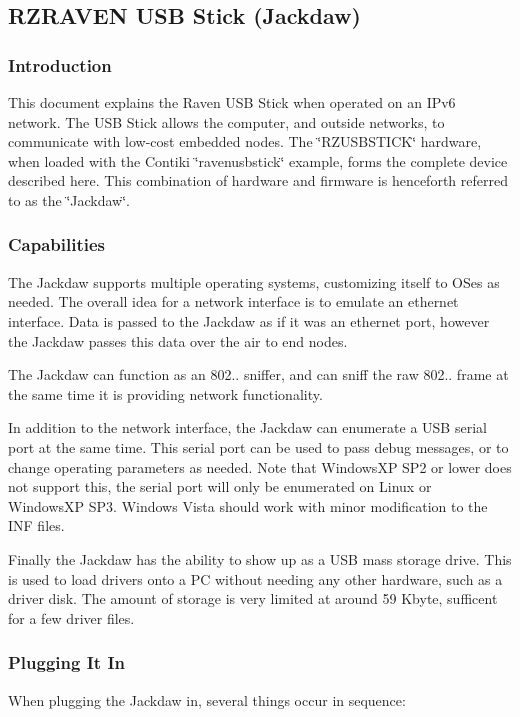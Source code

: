 \hypertarget{a00067}{}\subsection{R\+Z\+R\+A\+V\+EN U\+SB Stick (Jackdaw)}
\label{a00067}
\hypertarget{a00072_introduction}{}\subsubsection{Introduction}\label{a00072_introduction}
This document explains the Raven U\+SB Stick when operated on an I\+Pv6 network. The U\+SB Stick allows the computer, and outside networks, to communicate with low-\/cost embedded nodes. The \char`\"{}\+R\+Z\+U\+S\+B\+S\+T\+I\+C\+K\char`\"{} hardware, when loaded with the Contiki \char`\"{}ravenusbstick\char`\"{} example, forms the complete device described here. This combination of hardware and firmware is henceforth referred to as the \char`\"{}\+Jackdaw\char`\"{}.\hypertarget{a00067_capabilities}{}\subsubsection{Capabilities}\label{a00067_capabilities}
The Jackdaw supports multiple operating systems, customizing itself to O\+Ses as needed. The overall idea for a network interface is to emulate an ethernet interface. Data is passed to the Jackdaw as if it was an ethernet port, however the Jackdaw passes this data over the air to end nodes.

The Jackdaw can function as an 802.. sniffer, and can sniff the raw 802.. frame at the same time it is providing network functionality.

In addition to the network interface, the Jackdaw can enumerate a U\+SB serial port at the same time. This serial port can be used to pass debug messages, or to change operating parameters as needed. Note that Windows\+XP S\+P2 or lower does not support this, the serial port will only be enumerated on Linux or Windows\+XP S\+P3. Windows Vista should work with minor modification to the I\+NF files.

Finally the Jackdaw has the ability to show up as a U\+SB mass storage drive. This is used to load drivers onto a PC without needing any other hardware, such as a driver disk. The amount of storage is very limited at around 59 Kbyte, sufficent for a few driver files.\hypertarget{a00067_pluging}{}\subsubsection{Plugging It In}\label{a00067_pluging}
When plugging the Jackdaw in, several things occur in sequence\+:


